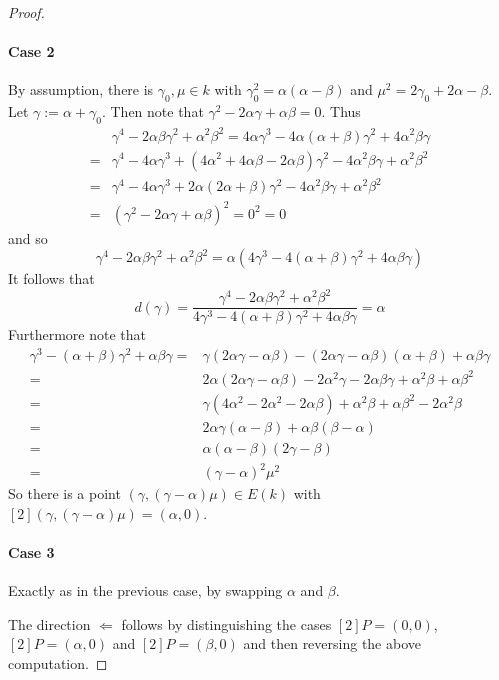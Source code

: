 \documentclass{scrartcl}
\theoremstyle{definition}
\begin{document}
\begin{proof}
    \paragraph{Case 2} By assumption, there is $\gamma_0, \mu \in k$ with $\gamma_0^2 = \alpha(\alpha - \beta)$ and $\mu^2 = 2\gamma_0 + 2\alpha - \beta$.
    Let $\gamma := \alpha + \gamma_0$.
    Then note that $\gamma^2 - 2\alpha\gamma + \alpha\beta = 0$.
    Thus
    \begin{align*}
        &\gamma^4 - 2 \alpha \beta \gamma^2 + \alpha^2 \beta^2 = 4\alpha \gamma^3 - 4\alpha(\alpha + \beta) \gamma^2 + 4 \alpha^2 \beta \gamma \\
        =& \gamma^4 - 4\alpha \gamma^3 + (4\alpha^2 + 4\alpha\beta - 2\alpha\beta)\gamma^2 - 4\alpha^2\beta \gamma + \alpha^2\beta^2 \\
        =& \gamma^4 - 4\alpha \gamma^3 + 2\alpha(2\alpha + \beta)\gamma^2 - 4\alpha^2\beta \gamma + \alpha^2\beta^2 \\
        =& (\gamma^2 - 2\alpha \gamma + \alpha \beta)^2 = 0^2 = 0
    \end{align*}
    and so
    \begin{equation*}
        \gamma^4 - 2 \alpha \beta \gamma^2 + \alpha^2 \beta^2 = \alpha(4\gamma^3 - 4(\alpha + \beta) \gamma^2 + 4 \alpha \beta \gamma)
    \end{equation*}
    It follows that
    \begin{equation*}
        d(\gamma) = \frac {\gamma^4 - 2 \alpha \beta \gamma^2 + \alpha^2 \beta^2} {4\gamma^3 - 4(\alpha + \beta) \gamma^2 + 4 \alpha \beta \gamma} = \alpha
    \end{equation*}
    Furthermore note that
    \begin{align*}
        \gamma^3 - (\alpha + \beta)\gamma^2 + \alpha\beta\gamma =& \gamma(2\alpha\gamma - \alpha\beta) - (2\alpha\gamma - \alpha\beta)(\alpha + \beta) + \alpha\beta\gamma \\
        =& 2\alpha(2\alpha\gamma - \alpha\beta) - 2\alpha^2\gamma - 2\alpha\beta\gamma + \alpha^2\beta + \alpha\beta^2 \\
        =& \gamma(4\alpha^2 - 2\alpha^2 - 2\alpha\beta) + \alpha^2\beta + \alpha\beta^2 - 2\alpha^2\beta \\
        =& 2\alpha\gamma(\alpha - \beta) + \alpha\beta(\beta - \alpha) \\
        =& \alpha(\alpha - \beta)(2\gamma - \beta) \\
        =& (\gamma - \alpha)^2\mu^2
    \end{align*}
    So there is a point $(\gamma, (\gamma - \alpha)\mu) \in E(k)$ with $[2](\gamma, (\gamma - \alpha)\mu) = (\alpha, 0)$.

    \paragraph{Case 3} Exactly as in the previous case, by swapping $\alpha$ and $\beta$.

    The direction $\Leftarrow$ follows by distinguishing the cases $[2]P = (0, 0)$, $[2]P = (\alpha, 0)$ and $[2]P = (\beta, 0)$ and then reversing the above computation.
\end{proof}
\end{document}
